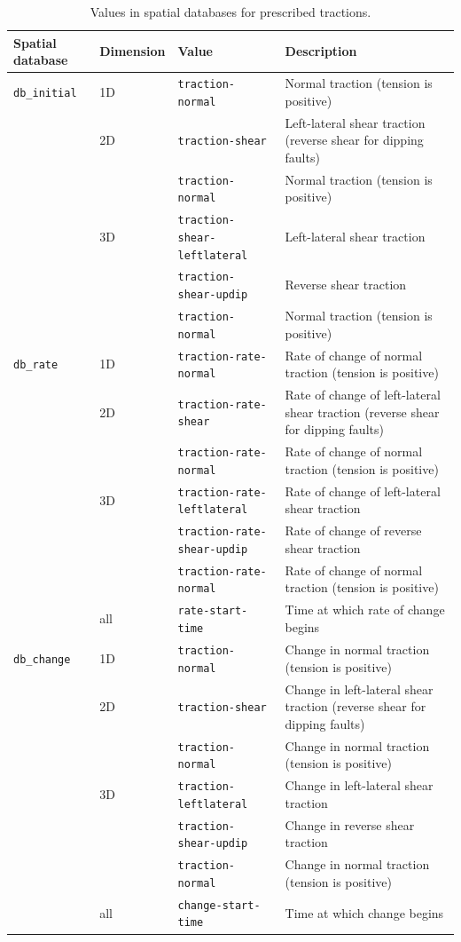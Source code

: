 \noindent \begin{center}
\begin{table}[H]
\noindent \centering{}\caption{\label{tab:fault:cohesive:dyn:prescribed:tractions}Values in spatial
databases for prescribed tractions.}
\medskip{}
\begin{tabular}{|l|l|l|>{\raggedright}p{2.5in}|}
\hline 
\textbf{Spatial database} & \textbf{Dimension} & \textbf{Value} & \textbf{Description}\tabularnewline
\hline 
\hline 
\texttt{db\_initial} & 1D & \texttt{traction-normal} & Normal traction (tension is positive)\tabularnewline
\cline{2-4} 
 & 2D & \texttt{traction-shear} & Left-lateral shear traction (reverse shear for dipping faults)\tabularnewline
\cline{3-4} 
 &  & \texttt{traction-normal} & Normal traction (tension is positive)\tabularnewline
\cline{2-4} 
 & 3D & \texttt{traction-shear-leftlateral} & Left-lateral shear traction\tabularnewline
\cline{3-4} 
 &  & \texttt{traction-shear-updip} & Reverse shear traction\tabularnewline
\cline{3-4} 
 &  & \texttt{traction-normal} & Normal traction (tension is positive)\tabularnewline
\hline 
\texttt{db\_rate} & 1D & \texttt{traction-rate-normal} & Rate of change of normal traction (tension is positive)\tabularnewline
\cline{2-4} 
 & 2D & \texttt{traction-rate-shear} & Rate of change of left-lateral shear traction (reverse shear for dipping
faults)\tabularnewline
 &  & \texttt{traction-rate-normal} & Rate of change of normal traction (tension is positive)\tabularnewline
\cline{2-4} 
 & 3D & \texttt{traction-rate-leftlateral} & Rate of change of left-lateral shear traction\tabularnewline
 &  & \texttt{traction-rate-shear-updip} & Rate of change of reverse shear traction\tabularnewline
 &  & \texttt{traction-rate-normal} & Rate of change of normal traction (tension is positive)\tabularnewline
\cline{2-4} 
 & all & \texttt{rate-start-time} & Time at which rate of change begins\tabularnewline
\hline 
\texttt{db\_change} & 1D & \texttt{traction-normal} & Change in normal traction (tension is positive)\tabularnewline
\cline{2-4} 
 & 2D & \texttt{traction-shear} & Change in left-lateral shear traction (reverse shear for dipping faults)\tabularnewline
 &  & \texttt{traction-normal} & Change in normal traction (tension is positive)\tabularnewline
\cline{2-4} 
 & 3D & \texttt{traction-leftlateral} & Change in left-lateral shear traction\tabularnewline
 &  & \texttt{traction-shear-updip} & Change in reverse shear traction\tabularnewline
 &  & \texttt{traction-normal} & Change in normal traction (tension is positive)\tabularnewline
\cline{2-4} 
 & all & \texttt{change-start-time} & Time at which change begins\tabularnewline

\end{tabular}
\end{table}
\end{center}
